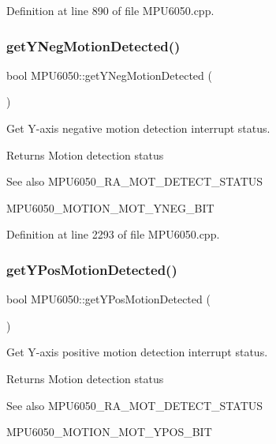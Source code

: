 Definition at line 890 of file M\+P\+U6050.\+cpp.

\mbox{\label{classMPU6050_a6c45be7b4aa9081c83ee0f4081bf0827}} 
\subsubsection{\texorpdfstring{getYNegMotionDetected()}{getYNegMotionDetected()}}
{\footnotesize\ttfamily bool M\+P\+U6050\+::get\+Y\+Neg\+Motion\+Detected (\begin{DoxyParamCaption}{ }\end{DoxyParamCaption})}



Get Y-\/axis negative motion detection interrupt status. 

\begin{DoxyReturn}{Returns}
Motion detection status 
\end{DoxyReturn}
\begin{DoxySeeAlso}{See also}
M\+P\+U6050\+\_\+\+R\+A\+\_\+\+M\+O\+T\+\_\+\+D\+E\+T\+E\+C\+T\+\_\+\+S\+T\+A\+T\+US 

M\+P\+U6050\+\_\+\+M\+O\+T\+I\+O\+N\+\_\+\+M\+O\+T\+\_\+\+Y\+N\+E\+G\+\_\+\+B\+IT 
\end{DoxySeeAlso}


Definition at line 2293 of file M\+P\+U6050.\+cpp.

\mbox{\label{classMPU6050_ad959ec84b9fe9f7e416b7af252f37abc}} 
\subsubsection{\texorpdfstring{getYPosMotionDetected()}{getYPosMotionDetected()}}
{\footnotesize\ttfamily bool M\+P\+U6050\+::get\+Y\+Pos\+Motion\+Detected (\begin{DoxyParamCaption}{ }\end{DoxyParamCaption})}



Get Y-\/axis positive motion detection interrupt status. 

\begin{DoxyReturn}{Returns}
Motion detection status 
\end{DoxyReturn}
\begin{DoxySeeAlso}{See also}
M\+P\+U6050\+\_\+\+R\+A\+\_\+\+M\+O\+T\+\_\+\+D\+E\+T\+E\+C\+T\+\_\+\+S\+T\+A\+T\+US 

M\+P\+U6050\+\_\+\+M\+O\+T\+I\+O\+N\+\_\+\+M\+O\+T\+\_\+\+Y\+P\+O\+S\+\_\+\+B\+IT 
\end{DoxySeeAlso}


